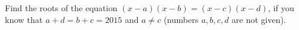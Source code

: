 Find the roots of the equation  $(x-a)(x-b)=(x-c)(x-d)$, if you know that $a+d=b+c=2015$ and $a \ne c$ (numbers $a, b, c, d$ are not given).